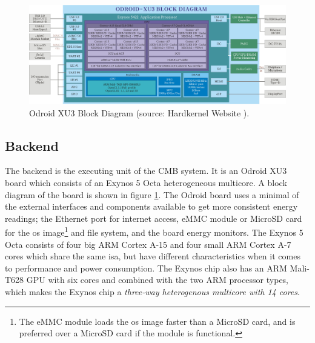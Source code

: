 \begin{figure}
    \includegraphics[width=1.0\textwidth]{figs/block-xu3.jpg}
    \caption[Odroid XU3 Block Diagram.]{Odroid XU3 Block Diagram (source: Hardkernel Website \cite{XU3-BLOCK}).}
    \label{fig:odroid-block}
\end{figure}

\subsection{Backend}
\label{subsec:cmb-arch-backend}
The backend is the executing unit of the CMB system. It is an Odroid XU3 board \cite{XU3} which consists of an Exynos 5 Octa heterogeneous multicore. A block diagram of the board is shown in figure \ref{fig:odroid-block}.  The Odroid board uses a minimal of the external interfaces and components available to get more consistent energy readings; the Ethernet port for internet access, eMMC module or MicroSD card for the \gls{os} image\footnote{The eMMC module loads the \gls{os} image faster than a MicroSD card, and is preferred over a MicroSD card if the module is functional.} and file system, and the board energy monitors. The Exynos 5 Octa consists of four big ARM Cortex A-15 and four small ARM Cortex A-7 cores which share the same \gls{isa}, but have different characteristics when it comes to performance and power consumption. The Exynos chip also has an ARM Mali-T628 GPU with six cores and combined with the two ARM processor types, which makes the Exynos chip a \textit{three-way heterogenous multicore with 14 cores}. \\

